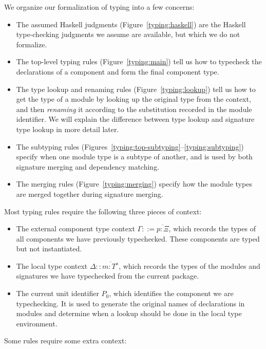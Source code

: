 We organize our formalization of \Backpack{} typing into a few
concerns:

\begin{itemize}
    \item The assumed Haskell judgments (Figure~\ref{typing:haskell}) are the
        Haskell type-checking judgments we assume are available, but which
        we do not formalize.

    \item The top-level typing rules (Figure~\ref{typing:main}) tell us
        how to typecheck the declarations of a component and form the final
        component type.

    \item The type lookup and renaming rules (Figure~\ref{typing:lookup}) tell us how to
        get the type of a module by looking up the original type from
        the context, and then \emph{renaming} it according to the substitution
        recorded in the module identifier.  We will explain the difference
        between type lookup and signature type lookup in more detail later.

    \item The subtyping rules (Figures~\ref{typing:top-subtyping}--\ref{typing:subtyping})
        specify when one module type is a subtype of another, and is used
        by both signature merging and dependency matching.

    \item The merging rules (Figure~\ref{typing:merging}) specify how the
        module types are merged together during signature merging.

\end{itemize}
Most typing rules require the following three pieces of context:

\begin{itemize}
    \item The external component type context $\Gamma ::= \overline{p : \Xi}$,
        which records the types of all components we have previously
        typechecked.  These components are typed but not instantiated.
    \item The local type context $\Delta :: \overline{m : T^s}$,
        which records the types of the modules and signatures we have typechecked
        from the current package.
    \item The current unit identifier $P_0$, which identifies the component
        we are typechecking. It is used to generate the original names
        of declarations in modules and determine when a lookup should be
        done in the local type environment.
\end{itemize}
Some rules require some extra context:

